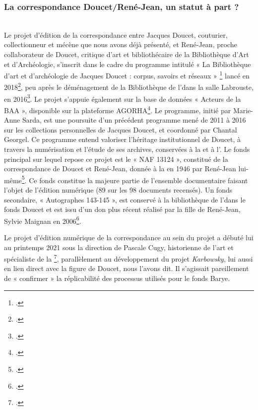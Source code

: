\subsubsection{La correspondance Doucet/René-Jean, un statut à part ?}

\\

Le projet d’édition de la correspondance entre Jacques Doucet, couturier, collectionneur et mécène que nous avons déjà présenté, et René-Jean, proche collaborateur de Doucet, critique d’art et bibliothécaire de la Bibliothèque d’Art et d’Archéologie, s’inscrit dans le cadre du programme intitulé « La Bibliothèque d'art et d'archéologie de Jacques Doucet : corpus, savoirs et réseaux » \footcite{lequipe_du_carnet_edition_2021} lancé en 2018\footcite{noauthor_a_nodate}, peu après le déménagement de la Bibliothèque de l’\inha dans la salle Labrouste, en 2016\footcite[p.17-19]{cugy_histoire_2020}. Le projet s’appuie également sur la base de données « Acteurs de la BAA », disponible sur la plateforme AGORHA\footcite{inha_lettres_nodate}. 
Le programme, initié par Marie-Anne Sarda, est une poursuite d’un précédent programme mené de 2011 à 2016 sur les collections personnelles de Jacques Doucet, et coordonné par Chantal Georgel. Ce programme entend valoriser l’héritage institutionnel de Doucet, à travers la numérisation et l’étude de ses archives, conservées à la \bnf et à l’\inha. Le fonds principal sur lequel repose ce projet est le « NAF 13124 », constitué de la correspondance de Doucet et René-Jean, donnée à la \bnf en 1946 par René-Jean lui-même\footcite{inha_lettres_nodate}. Ce fonds constitue la majeure partie de l’ensemble documentaire faisant l’objet de l’édition numérique (89 sur les 98 documents recensés). Un fonds secondaire, « Autographes 143-145 », est conservé à la bibliothèque de l'\inha dans le fonds Doucet et est issu d’un don plus récent réalisé par la fille de René-Jean, Sylvie Maignan en 2006\footcite{flejou_jacques_2015}.

Le projet d’édition numérique de la correspondance au sein du projet \pense a débuté lui au printemps 2021 sous la direction de Pascale Cugy, historienne de l’art et spécialiste de la \baa\footcite[p.2]{cugy_histoire_2020}, parallèlement au développement du projet \textit{Karbowsky}, lui aussi en lien direct avec la figure de Doucet, nous l’avons dit. Il s’agissait pareillement de « confirmer » la réplicabilité des processus utilisés pour le fonds Barye. 

